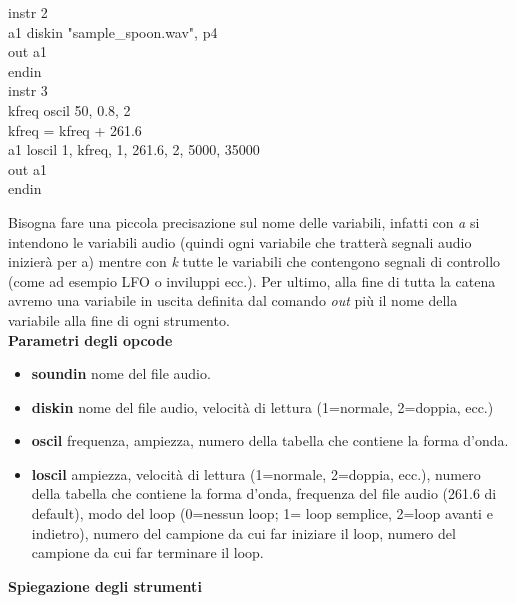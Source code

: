 \documentclass[11pt]{article}
\begin{document}
\begin{multicols*}{2}
\begin{center}
\begin{minipage}[c]{6.2cm}
\begin{sffamily}
instr 2\\
a1 diskin "sample\_spoon.wav", p4 \\
out a1\\
endin\\

instr 3\\
kfreq oscil 50, 0.8, 2\\
kfreq = kfreq + 261.6\\
a1 loscil 1, kfreq, 1, 261.6, 2, 5000, 35000\\ 
out a1\\
endin\\

\end{sffamily}
\end{minipage}
\end{center}

Bisogna fare una piccola precisazione sul nome delle variabili, infatti con \textit{a} si intendono le variabili audio (quindi ogni variabile che tratterà segnali audio inizierà per a) mentre con \textit{k} tutte le variabili che contengono segnali di controllo (come ad esempio LFO o inviluppi ecc.). Per ultimo, alla fine di tutta la catena avremo una variabile in uscita definita dal comando \textit{out} più il nome della variabile alla fine di ogni strumento.\\

\textbf{\textsf {Parametri degli opcode}}\\

\begin{itemize}
\item \textbf{soundin} nome del file audio.
\item \textbf{diskin} nome del file audio, velocità di lettura (1=normale, 2=doppia, ecc.)
\item \textbf{oscil} frequenza, ampiezza, numero della tabella che contiene la forma d'onda.
\item \textbf{loscil} ampiezza, velocità di lettura (1=normale, 2=doppia, ecc.), numero della tabella che contiene la forma d'onda, frequenza del file audio (261.6 di default), modo del loop (0=nessun loop; 1= loop semplice, 2=loop avanti e indietro), numero del campione da cui far iniziare il loop, numero del campione da cui far terminare il loop.\\
\end{itemize}

\textbf{\textsf {Spiegazione degli strumenti}}\\


\end{multicols*}
\end{document}
